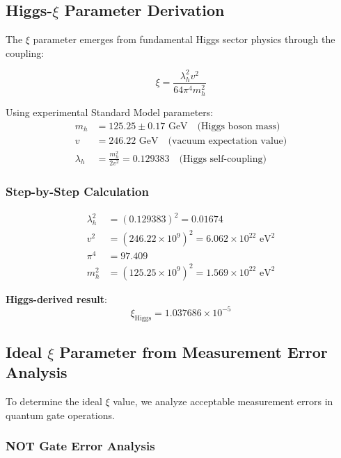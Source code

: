 \documentclass[12pt,a4paper]{article}
\begin{document}
	\subsection{Higgs-$\xi$ Parameter Derivation}
	
	The $\xi$ parameter emerges from fundamental Higgs sector physics through the coupling:
	
	\begin{equation}
		\xi = \frac{\lambda_h^2 v^2}{64\pi^4 m_h^2}
		\label{eq:higgs_xi_appendix}
	\end{equation}
	
	Using experimental Standard Model parameters:
	\begin{align}
		m_h &= 125.25 \pm 0.17 \text{ GeV} \quad \text{(Higgs boson mass)} \\
		v &= 246.22 \text{ GeV} \quad \text{(vacuum expectation value)} \\
		\lambda_h &= \frac{m_h^2}{2v^2} = 0.129383 \quad \text{(Higgs self-coupling)}
	\end{align}
	
	\subsubsection{Step-by-Step Calculation}
	
	\begin{align}
		\lambda_h^2 &= (0.129383)^2 = 0.01674 \\
		v^2 &= (246.22 \times 10^9)^2 = 6.062 \times 10^{22} \text{ eV}^2 \\
		\pi^4 &= 97.409 \\
		m_h^2 &= (125.25 \times 10^9)^2 = 1.569 \times 10^{22} \text{ eV}^2
	\end{align}
	
	\textbf{Higgs-derived result}:
	\begin{equation}
		\xi_{\text{Higgs}} = 1.037686 \times 10^{-5}
	\end{equation}
	
	\subsection{Ideal $\xi$ Parameter from Measurement Error Analysis}
	
	To determine the ideal $\xi$ value, we analyze acceptable measurement errors in quantum gate operations.
	
	\subsubsection{NOT Gate Error Analysis}
	
\end{document}
